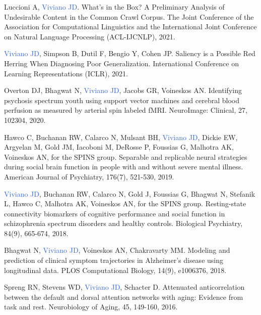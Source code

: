 \documentclass[a4paper,11pt,oneside]{book}
\newcommand\paper[1]{
    #1\\
    \vspace{3.5mm}
}
\begin{document}
\begin{flushleft}
\paper{Luccioni A, \textcolor{highlight}{Viviano JD}. What's in the Box? A Preliminary Analysis of Undesirable Content in the Common Crawl Corpus. The Joint Conference of the Association for Computational Linguistics and the International Joint Conference on Natural Language Processing (ACL-IJCNLP), 2021.}

\paper{\textcolor{highlight}{Viviano JD}, Simpson B, Dutil F, Bengio Y, Cohen JP. Saliency is a Possible Red Herring When Diagnosing Poor Generalization. International Conference on Learning Representations (ICLR), 2021.}

\paper{Overton DJ, Bhagwat N, \textcolor{highlight}{Viviano JD}, Jacobs GR, Voineskos AN. Identifying psychosis spectrum youth using support vector machines and cerebral blood perfusion as measured by arterial spin labeled fMRI. NeuroImage: Clinical, 27, 102304, 2020.}

\paper{Hawco C, Buchanan RW, Calarco N, Mulsant BH, \textcolor{highlight}{Viviano JD}, Dickie EW, Argyelan M, Gold JM, Iacoboni M, DeRosse P, Foussias G, Malhotra AK, Voineskos AN, for the SPINS group. Separable and replicable neural strategies during social brain function in people with and without severe mental illness. American Journal of Psychiatry, 176(7), 521-530, 2019.}

\paper{\textcolor{highlight}{Viviano JD}, Buchanan RW, Calarco N, Gold J, Foussias G, Bhagwat N, Stefanik L, Hawco C, Malhotra AK, Voineskos AN, for the SPINS group. Resting-state connectivity biomarkers of cognitive performance and social function in schizophrenia spectrum disorders and healthy controls. Biological Psychiatry, 84(9), 665-674, 2018.}

\paper{Bhagwat N, \textcolor{highlight}{Viviano JD}, Voineskos AN, Chakravarty MM. Modeling and prediction of clinical symptom trajectories in Alzheimer's disease using longitudinal data. PLOS Computational Biology, 14(9), e1006376, 2018.}


\paper{Spreng RN, Stevens WD, \textcolor{highlight}{Viviano JD}, Schacter D. Attenuated anticorrelation between the default and dorsal attention networks with aging: Evidence from task and rest. Neurobiology of Aging, 45, 149-160, 2016.}


\end{flushleft}
\end{document}
